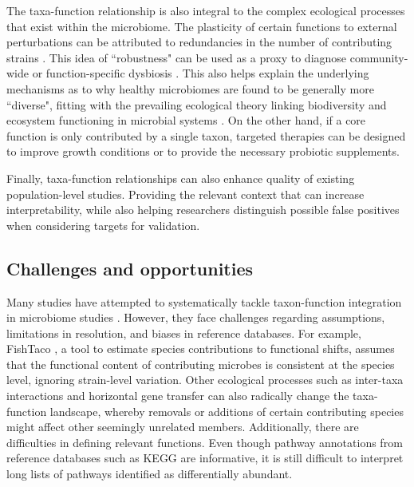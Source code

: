 The taxa-function relationship is also integral to the complex ecological processes that exist within the microbiome. The plasticity of certain functions to external perturbations can be attributed to redundancies in the number of contributing strains \cite{walker1992biodiversity, moya2016functional}. This idea of ``robustness" \cite{eng2018taxafunction} can be used as a proxy to diagnose community-wide or function-specific dysbiosis \cite{vieira-silva2016species}. This also helps explain the underlying mechanisms as to why healthy microbiomes are found to be generally more ``diverse", fitting with the prevailing ecological theory linking biodiversity and ecosystem functioning in microbial systems \cite{tilman2014biodiversity}. On the other hand, if a core function is only contributed by a single taxon, targeted therapies can be designed to improve growth conditions or to provide the necessary probiotic supplements.  

Finally, taxa-function relationships can also enhance quality of existing population-level studies. Providing the relevant context that can increase interpretability, while also helping researchers distinguish possible false positives when considering targets for validation. 

\subsection{Challenges and opportunities}

Many studies have attempted to systematically tackle taxon-function integration in microbiome studies \cite{manor2017systematic, vieira-silva2016species, eng2018taxafunction, noecker2019defining}. However, they face challenges regarding assumptions, limitations in resolution, and biases in reference databases. For example, FishTaco \cite{manor2017systematic}, a tool to estimate species contributions to functional shifts, assumes that the functional content of contributing microbes is consistent at the species level, ignoring strain-level variation. Other ecological processes such as inter-taxa interactions and horizontal gene transfer can also radically change the taxa-function landscape, whereby removals or additions of certain contributing species might affect other seemingly unrelated members. Additionally, there are difficulties in defining relevant functions. Even though pathway annotations from reference databases such as KEGG are informative, it is still difficult to interpret long lists of pathways identified as differentially abundant. 

